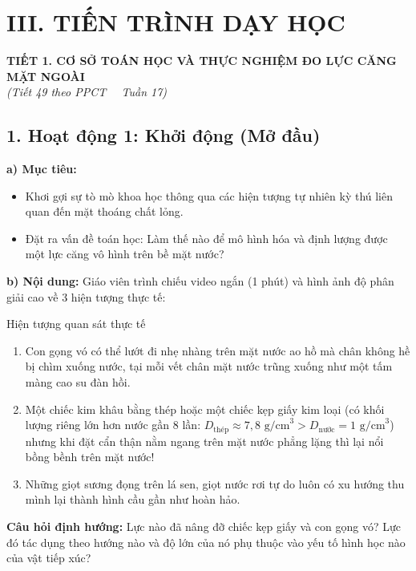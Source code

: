 \documentclass[12pt, a4paper]{article}
\begin{document}
\vspace{5pt}

\section*{III. TIẾN TRÌNH DẠY HỌC}

\begin{center}
    {\fontsize{13pt}{16pt}\selectfont \textbf{TIẾT 1. CƠ SỞ TOÁN HỌC VÀ THỰC NGHIỆM ĐO LỰC CĂNG MẶT NGOÀI}}\\[2pt]
    \textit{(Tiết 49 theo PPCT \ \textbar \ Tuần 17)}
\end{center}

\subsection*{1. Hoạt động 1: Khởi động (Mở đầu)}

\noindent \textbf{a) Mục tiêu:}
\begin{itemize}[leftmargin=0.6cm]
    \item Khơi gợi sự tò mò khoa học thông qua các hiện tượng tự nhiên kỳ thú liên quan đến mặt thoáng chất lỏng.
    \item Đặt ra vấn đề toán học: Làm thế nào để mô hình hóa và định lượng được một lực căng vô hình trên bề mặt nước?
\end{itemize}

\noindent \textbf{b) Nội dung:}
Giáo viên trình chiếu video ngắn (1 phút) và hình ảnh độ phân giải cao về 3 hiện tượng thực tế:
\begin{pedabox}{Hiện tượng quan sát thực tế}
    \begin{enumerate}
        \item Con gọng vó có thể lướt đi nhẹ nhàng trên mặt nước ao hồ mà chân không hề bị chìm xuống nước, tại mỗi vết chân mặt nước trũng xuống như một tấm màng cao su đàn hồi.
        \item Một chiếc kim khâu bằng thép hoặc một chiếc kẹp giấy kim loại (có khối lượng riêng lớn hơn nước gần 8 lần: $D_{\text{thép}} \approx 7{,}8\text{ g/cm}^3 > D_{\text{nước}} = 1\text{ g/cm}^3$) nhưng khi đặt cẩn thận nằm ngang trên mặt nước phẳng lặng thì lại nổi bồng bềnh trên mặt nước!
        \item Những giọt sương đọng trên lá sen, giọt nước rơi tự do luôn có xu hướng thu mình lại thành hình cầu gần như hoàn hảo.
    \end{enumerate}
    \textbf{Câu hỏi định hướng:} Lực nào đã nâng đỡ chiếc kẹp giấy và con gọng vó? Lực đó tác dụng theo hướng nào và độ lớn của nó phụ thuộc vào yếu tố hình học nào của vật tiếp xúc?
\end{pedabox}
\end{document}
